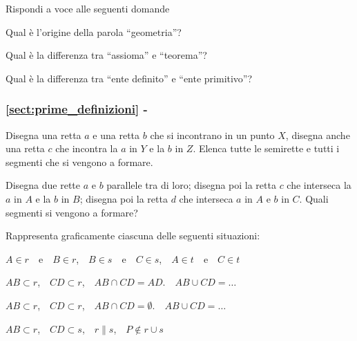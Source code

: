 \begin{esercizio}
\label{ese:1.42}
Rispondi a voce alle seguenti domande
\begin{enumeratea}
\item Qual è l'origine della parola ``geometria''?
\item Qual è la differenza tra ``assioma'' e ``teorema''?
\item Qual è la differenza tra ``ente definito'' e ``ente primitivo''?
\end{enumeratea}
\end{esercizio}

\begingroup
\hypersetup{linkcolor=black}
\subsubsection*{\ref{sect:prime_definizioni} - 
}
\endgroup

\begin{esercizio}
\label{ese:1.43}
Disegna una retta \(a\) e una retta \(b\) che si incontrano in un punto 
\(X\), disegna anche una retta \(c\) che incontra la \(a\) in \(Y\) e la \(b\) 
in \(Z\). Elenca tutte le semirette e tutti i segmenti che si vengono a 
formare.
\end{esercizio}

\begin{esercizio}
\label{ese:1.44}
Disegna due rette \(a\) e \(b\) parallele tra di loro; disegna poi la 
retta \(c\) che interseca la \(a\) in \(A\) e la \(b\) in \(B\); disegna poi la 
retta \(d\) che interseca \(a\) in \(A\) e \(b\) in \(C\). Quali segmenti si 
vengono a formare?
\end{esercizio}

\begin{esercizio}
\label{ese:1.45}
Rappresenta graficamente ciascuna delle seguenti situazioni:
\begin{enumeratea}
\item \(A\in r\)~~e~~\(B\in r\),~~\(B\in s\)~~e~~\(C\in s\),~~\(A\in 
t\)~~e~~\(C\in t\)
\item \(AB\subset r\),~~\(CD\subset r\),~~\(AB\cap CD=AD\).~~\(AB\cup 
CD=\ldots{}\)
\item \(AB\subset r\),~~\(CD\subset r\),~~\(AB\cap CD=\emptyset\).~~\(AB\cup 
CD=\ldots{}\)
\item \(AB\subset r\),~~\(CD\subset s\),~~\(r\parallel s\),~~\(P\notin r\cup 
s\)
\end{enumeratea}
\end{esercizio}

